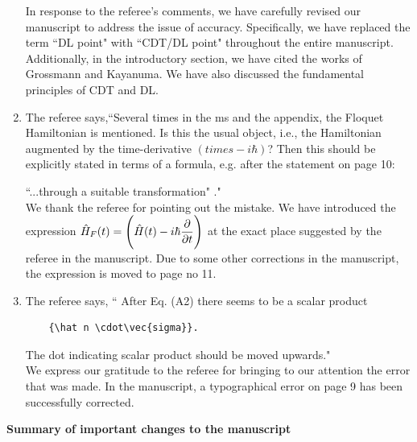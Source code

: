 \documentclass[aps,prb,reprint,showpacs,floatfix,superscriptaddress, onecolumn, 9pt]{revtex4-2}
\newcommand{\ar}[1]{{\color{blue}#1}} %
\begin{document}
\begin{enumerate}
{    In response to the referee's comments, we have carefully revised our manuscript to address the issue of accuracy. Specifically, we have replaced the term ``DL point" with ``CDT/DL point" throughout the entire manuscript. Additionally, in the introductory section, we have cited the works of Grossmann and Kayanuma. We have also discussed the fundamental principles of CDT and DL.
    }

    \item The referee says,``Several times in the ms and the appendix, the Floquet Hamiltonian is mentioned. Is this the usual object, i.e., the Hamiltonian augmented by the time-derivative $(times -i\hbar)$? Then this should be explicitly stated in terms of a formula, e.g. after the statement on page 10:

    ``...through a suitable transformation" ."\\

    \ar{
    We thank the referee for pointing out the mistake. We have introduced the expression $\displaystyle \hat{H}_F(t) = \Bigg(\hat{H}(t) - i\hbar \pdv{t}\Bigg)$ at the exact place suggested by the referee in the manuscript. Due to some other corrections in the manuscript, the expression is moved to page no 11.
    }
    \item The referee says, `` After Eq. (A2) there seems to be a scalar product \begin{verbatim}
    {\hat n \cdot\vec{sigma}}.
    \end{verbatim} The dot indicating scalar product should be moved upwards."\\

    \ar{
    We express our gratitude to the referee for bringing to our attention the error that was made. In the manuscript, a typographical error on page 9 has been successfully corrected.
    }
\end{enumerate}
\vskip 1cm 
\noindent \textbf{Summary of important changes to the  manuscript}
\end{document}
